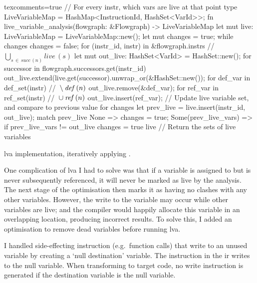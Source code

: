 \documentclass[00-main.tex]{subfiles}
\begin{document}
\begin{listing}[!t]
  \begin{RustListing*}{texcomments=true}
    // For every instr, which vars are live at that point
    type LiveVariableMap = HashMap<InstructionId, HashSet<VarId>>;
    fn live_variable_analysis(flowgraph: &Flowgraph) -> LiveVariableMap {
        let mut live: LiveVariableMap = LiveVariableMap::new();
        let mut changes = true;
        while changes {
            changes = false;
            for (instr_id, instr) in &flowgraph.instrs {
                // $\bigcup_{s \,\in\, \mathit{succ}\,(n)} \mathit{live}\,(s)$
                let mut out_live: HashSet<VarId> = HashSet::new();
                for successor in flowgraph.successors.get(instr_id) {
                    out_live.extend(live.get(successor).unwrap_or(&HashSet::new());
                }
                for def_var in def_set(instr) { // ${} \setminus \lvadef\,(n)$
                    out_live.remove(&def_var);
                }
                for ref_var in ref_set(instr) { // ${} \cup \lvaref\,(n)$
                    out_live.insert(ref_var);
                }
                // Update live variable set, and compare to previous value for changes
                let prev_live = live.insert(instr_id, out_live);
                match prev_live {
                    None => {
                        changes = true;
                    }
                    Some(prev_live_vars) => {
                        if prev_live_vars != out_live {
                            changes = true
                        }
                    }
                }
            }
        }
        live // Return the sets of live variables
    }
  \end{RustListing*}
  \caption{\Acrlong{lva} implementation, iteratively applying .}%
  \label{lst:lva implementation}
\end{listing}

One complication of \gls{lva} I had to solve was that if a variable is assigned to but is never subsequently referenced, it will never be marked as live by the analysis.
The next stage of the optimisation then marks it as having no clashes with any other variables.
However, the write to the variable may occur while other variables are live; and the compiler would happily allocate this variable in an overlapping location, producing incorrect results.
To solve this, I added an optimisation to remove dead variables before running \gls{lva}.

I handled side-effecting instruction (e.g.~function calls) that write to an unused variable by creating a `null destination' variable.
The instruction in the \gls{ir} writes to the null variable.
When transforming to target code, no write instruction is generated if the destination variable is the null variable.
\end{document}
